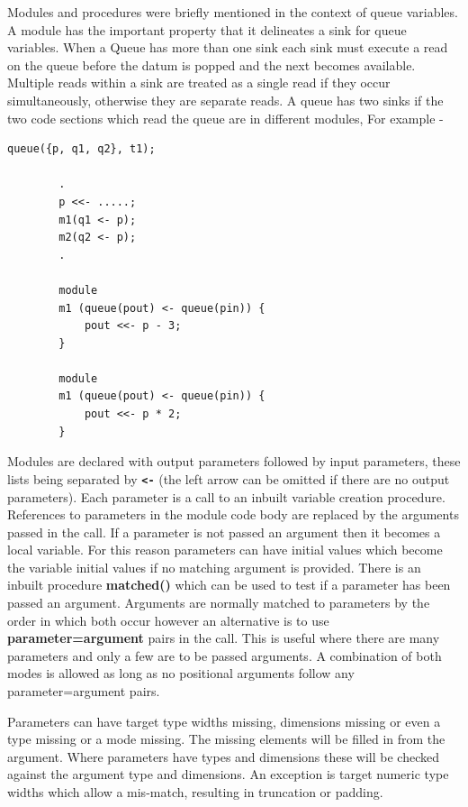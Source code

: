         Modules and procedures were briefly mentioned in the context of queue variables. A
        module has the important property that it delineates a sink for queue variables.
        When a Queue has more than one sink each sink must execute a read on the queue
        before the datum is popped and the next becomes available. Multiple reads within a
        sink are treated as a single read if they occur simultaneously, otherwise they are
        separate reads. A queue has two sinks if the two code sections which read the queue
        are in different modules, For example -
        \begin{lstlisting}[language=threepl]
        queue({p, q1, q2}, t1);

        .
        p <<- .....;
        m1(q1 <- p);
        m2(q2 <- p);
        .

        module
        m1 (queue(pout) <- queue(pin)) {
            pout <<- p - 3;
        }

        module
        m1 (queue(pout) <- queue(pin)) {
            pout <<- p * 2;
        }
        \end{lstlisting}
        Modules are declared with output parameters followed by input parameters,
        these lists being separated by {\bf \verb'<-'} (the left arrow can be
        omitted if there are no output parameters). Each parameter is a call to
        an inbuilt variable creation procedure. References to parameters in
        the module code body are replaced by the arguments passed in the call.
        If a parameter is not passed an argument then it becomes a local variable.
        For this reason parameters can have initial values which become the
        variable initial values if no matching argument is provided. There is
        an inbuilt procedure {\bf matched()} which can be used to test if a
        parameter has been passed an argument. Arguments are normally matched
        to parameters by the order in which both occur however an alternative
        is to use {\bf parameter=argument} pairs in the call. This is useful
        where there are many parameters and only a few are to be passed arguments.
        A combination of both modes is allowed as long as no positional arguments
        follow any parameter=argument pairs.

        Parameters can have target type widths missing, dimensions missing or
        even a type missing or a mode missing. The missing elements will be filled
        in from the argument. Where parameters have types and dimensions these
        will be checked against the argument type and dimensions. An exception
        is target numeric type widths which allow a mis-match, resulting in truncation
        or padding.

